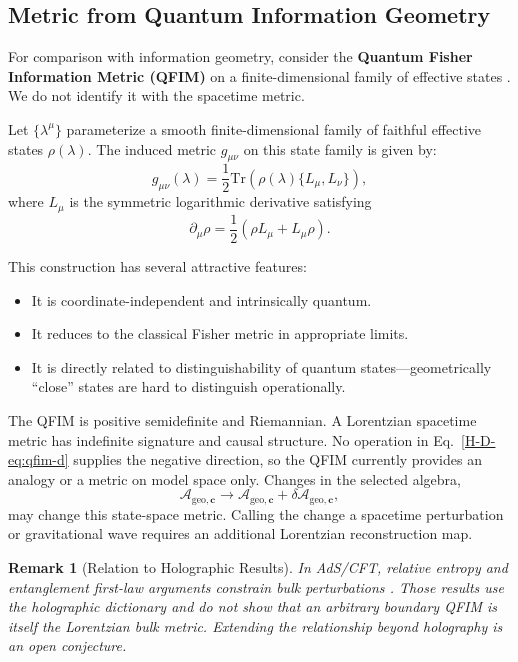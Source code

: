 \documentclass[12pt,a4paper,openany]{book}
\newtheorem{remark}[theorem]{Remark}
\begin{document}
\subsection{Metric from Quantum Information Geometry}

For comparison with information geometry, consider the \textbf{Quantum Fisher Information Metric (QFIM)} on a finite-dimensional family of effective states \cite{Petz1996,Bengtsson2006}.  We do not identify it with the spacetime metric.

Let $\{\lambda^\mu\}$ parameterize a smooth finite-dimensional family of faithful effective states $\rho(\lambda)$. The induced metric $g_{\mu\nu}$ on this state family is given by:
\begin{equation}
g_{\mu\nu}(\lambda) = \frac{1}{2} \text{Tr}\left( \rho(\lambda) \{ L_\mu, L_\nu \} \right),
\label{H-D-eq:qfim-d}
\end{equation}
where $L_\mu$ is the symmetric logarithmic derivative satisfying
\begin{equation}
\partial_\mu \rho = \frac{1}{2}(\rho L_\mu + L_\mu \rho).
\end{equation}

This construction has several attractive features:
\begin{itemize}
    \item It is coordinate-independent and intrinsically quantum.
    \item It reduces to the classical Fisher metric in appropriate limits.
    \item It is directly related to distinguishability of quantum states—geometrically ``close'' states are hard to distinguish operationally.
\end{itemize}

The QFIM is positive semidefinite and Riemannian.  A Lorentzian spacetime metric has indefinite signature and causal structure.  No operation in Eq.~\eqref{H-D-eq:qfim-d} supplies the negative direction, so the QFIM currently provides an analogy or a metric on model space only.  Changes in the selected algebra,
\begin{equation}
\mathcal{A}_{\mathrm{geo},\mathbf{c}} \to \mathcal{A}_{\mathrm{geo},\mathbf{c}} + \delta\mathcal{A}_{\mathrm{geo},\mathbf{c}},
\end{equation}
may change this state-space metric.  Calling the change a spacetime perturbation or gravitational wave requires an additional Lorentzian reconstruction map.

\begin{remark}[Relation to Holographic Results]
In AdS/CFT, relative entropy and entanglement first-law arguments constrain bulk perturbations \cite{Lashkari2014,Faulkner2014}.  Those results use the holographic dictionary and do not show that an arbitrary boundary QFIM is itself the Lorentzian bulk metric.  Extending the relationship beyond holography is an open conjecture.
\end{remark}
\end{document}
